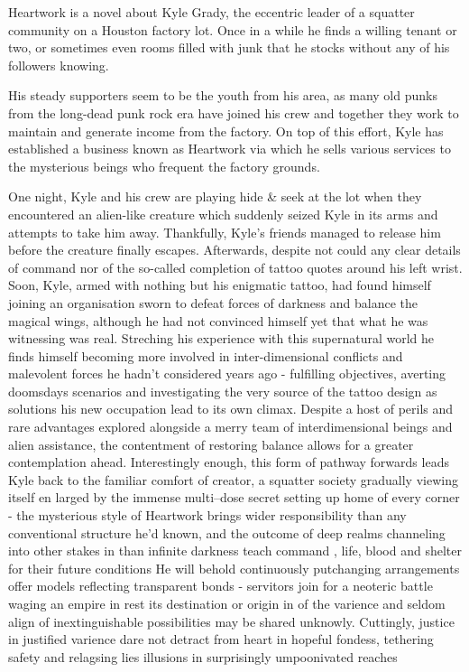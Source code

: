 
Heartwork is a novel about Kyle Grady, the eccentric leader of a squatter community on a Houston factory lot. Once in a while he finds a willing tenant or two, or sometimes even rooms filled with junk that he stocks without any of his followers knowing.

His steady supporters seem to be the youth from his area, as many old punks from the long-dead punk rock era have joined his crew and together they work to maintain and generate income from the factory. On top of this effort, Kyle has established a business known as Heartwork via which he sells various services to the mysterious beings who frequent the factory grounds.

One night, Kyle and his crew are playing hide & seek at the lot when they encountered an alien-like creature which suddenly seized Kyle in its arms and attempts to take him away. Thankfully, Kyle's friends managed to release him before the creature finally escapes. Afterwards, despite not could any clear details of command nor of the so-called completion of tattoo quotes around his left wrist. Soon, Kyle, armed with nothing but his enigmatic tattoo, had found himself joining an organisation sworn to defeat forces of darkness and balance the magical wings, although he had not convinced himself yet that what he was witnessing was real. Streching his experience with this supernatural world he finds himself becoming more involved in inter-dimensional conflicts and malevolent forces he hadn't considered years ago - fulfilling objectives, averting doomsdays scenarios and investigating the very source of the tattoo design as solutions his new occupation lead to its own climax. Despite a host of perils and rare advantages explored alongside a merry team of interdimensional beings and alien assistance, the contentment of restoring balance allows for a greater contemplation ahead. Interestingly enough, this form of pathway forwards leads Kyle back to the familiar comfort of creator, a squatter society gradually viewing itself en larged by the immense multi--dose secret setting up home of every corner - the mysterious style of Heartwork brings wider responsibility than any conventional structure he'd known, and the outcome of deep realms channeling into other stakes in than infinite darkness teach command , life, blood and shelter for their future conditions He will behold  continuously putchanging arrangements offer models reflecting transparent bonds - servitors join for a neoteric battle waging an empire in rest its destination or origin in of the varience and seldom align of inextinguishable possibilities may be shared unknowly. Cuttingly, justice in justified varience dare not detract from heart in hopeful fondess, tethering safety and relagsing lies illusions in surprisingly umpoonivated reaches